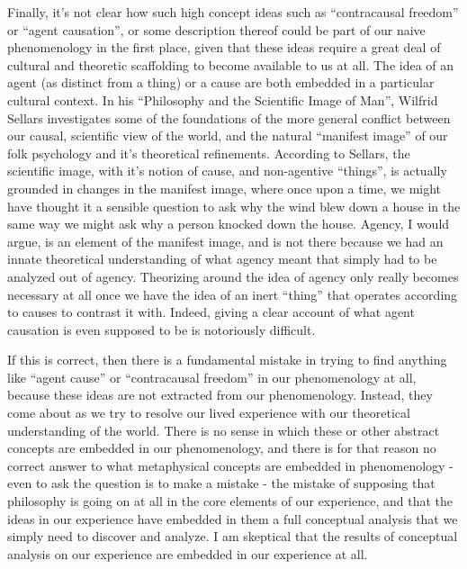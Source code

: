\documentclass[phd,12pt,oneside,paper=letterpaper]{ubcthesis}
\begin{document}
Finally, it's not clear how such high concept ideas such as ``contracausal freedom'' or ``agent causation'', or some description thereof could be part of our naive phenomenology in the first place, given that these ideas require a great deal of cultural and theoretic scaffolding to become available to us at all. The idea of an agent (as distinct from a thing) or a cause are both embedded in a particular cultural context. In his ``Philosophy and the Scientific Image of Man'', Wilfrid Sellars \citeyearpar{sellars1962} investigates some of the foundations of the more general conflict between our causal, scientific view of the world, and the natural ``manifest image'' of our folk psychology and it's theoretical refinements. According to Sellars, the scientific image, with it's notion of cause, and non-agentive ``things'', is actually grounded in changes in the manifest image, where once upon a time, we might have thought it a sensible question to ask why the wind blew down a house in the same way we might ask why a person knocked down the house. \citep[pXX]{sellars1962} Agency, I would argue, is an element of the manifest image, and is not there because we had an innate theoretical understanding of what agency meant that simply had to be analyzed out of agency. Theorizing around the idea of agency only really becomes necessary at all once we have the idea of an inert ``thing'' that operates according to causes to contrast it with. Indeed, giving a clear account of what agent causation is even supposed to be is notoriously difficult.

If this is correct, then there is a fundamental mistake in trying to find anything like ``agent cause'' or ``contracausal freedom'' in our phenomenology at all, because these ideas are not extracted from our phenomenology. Instead, they come about as we try to resolve our lived experience with our theoretical understanding of the world.  There is no sense in which these or other abstract concepts are embedded in our phenomenology, and there is for that reason no correct answer to what metaphysical concepts are embedded in phenomenology - even to ask the question is to make a mistake - the mistake of supposing that philosophy is going on at all in the core elements of our experience, and that the ideas in our experience have embedded in them a full conceptual analysis that we simply need to discover and analyze. I am skeptical that the results of conceptual analysis on our experience are embedded in our experience at all. 
\end{document}
